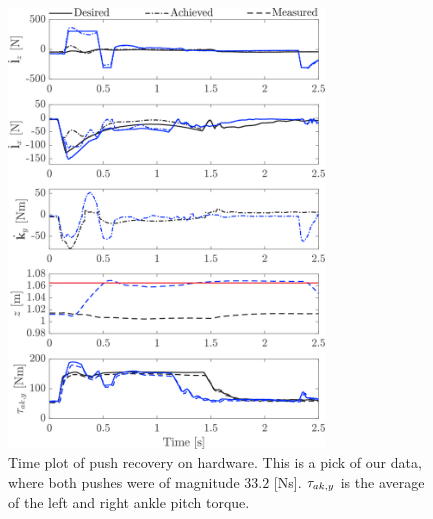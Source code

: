 \documentclass[letterpaper, 10 pt, conference]{ieeeconf}  %
\begin{document}
\begin{figure}[h]
      \centering
      \includegraphics[width=3.3in]{valcomparetimeHW.png}
      \caption{Time plot of push recovery on hardware. This is a pick of our data, where both pushes were of magnitude $33.2$ [Ns]. $\boldmath{\tau}_{ak,y}$ is the average of the left and right ankle pitch torque.}
      \label{fig:valcomparetimeHW}
\end{figure}
\end{document}
